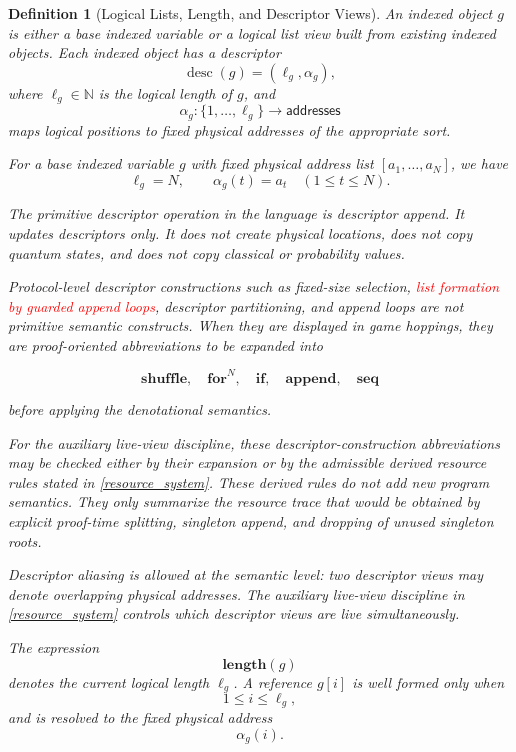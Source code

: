 \documentclass[acmsmall,screen,review,anonymous,nonacm]{acmart}
\newtheorem{definition}{Definition}[section]
\theoremstyle{defn_style}
\begin{document}
\begin{definition}[Logical Lists, Length, and Descriptor Views]
An indexed object \(g\) is either a base indexed variable or a logical list
view built from existing indexed objects. Each indexed object has a descriptor
\[
\operatorname{desc}(g)=(\ell_g,\alpha_g),
\]
where \(\ell_g\in\mathbb N\) is the logical length of \(g\), and
\[
\alpha_g:\{1,\ldots,\ell_g\}\to \mathsf{addresses}
\]
maps logical positions to fixed physical addresses of the appropriate sort.

For a base indexed variable \(g\) with fixed physical address list
\([a_1,\ldots,a_N]\), we have
\[
\ell_g=N,\qquad \alpha_g(t)=a_t\quad(1\le t\le N).
\]

The primitive descriptor operation in the language is descriptor append.
It updates descriptors only. It does not create physical locations, does not
copy quantum states, and does not copy classical or probability values.

Protocol-level descriptor constructions such as fixed-size selection, \textcolor{red}{list formation by guarded append loops}, descriptor partitioning, and append loops are not primitive semantic constructs. When they are displayed in game hoppings, they are proof-oriented abbreviations to be expanded into

\[
\mathbf{shuffle},\quad
\mathbf{for}^{N},\quad
\mathbf{if},\quad
\mathbf{append},\quad
\mathbf{seq}
\]

before applying the denotational semantics.


For the auxiliary live-view discipline, these descriptor-construction
abbreviations may be checked either by their expansion or by the admissible
derived resource rules stated in \ref{resource_system}. These derived rules do not add
new program semantics. They only summarize the resource trace that would be
obtained by explicit proof-time splitting, singleton append, and dropping of
unused singleton roots.

Descriptor aliasing is allowed at the semantic level: two descriptor views may
denote overlapping physical addresses. The auxiliary live-view discipline in
\ref{resource_system} controls which descriptor views are live simultaneously.

The expression
\[
\mathbf{length}(g)
\]
denotes the current logical length \(\ell_g\). A reference \(g[i]\) is well
formed only when
\[
1\le i\le \ell_g,
\]
and is resolved to the fixed physical address
\[
\alpha_g(i).
\]
\end{definition}
\end{document}
